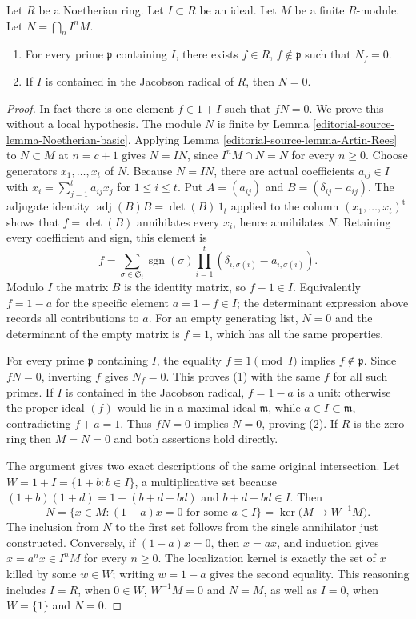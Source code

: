 \begin{lemma}
\label{editorial-source-lemma-intersection-powers-ideal-module}
Let $R$ be a Noetherian ring. Let $I \subset R$ be an ideal.
Let $M$ be a finite $R$-module. Let $N = \bigcap_n I^n M$.
\begin{enumerate}
\item For every prime $\mathfrak p$ containing $I$, there
exists $f \in R$, $f \not \in \mathfrak p$ such that $N_f = 0$.
\item If $I$ is contained in the Jacobson radical
of $R$, then $N = 0$.
\end{enumerate}
\end{lemma}

\begin{proof}
In fact there is one element $f\in1+I$ such that $fN=0$.
We prove this without a local hypothesis. The module $N$ is finite
by Lemma \ref{editorial-source-lemma-Noetherian-basic}. Applying
Lemma \ref{editorial-source-lemma-Artin-Rees} to $N\subset M$ at $n=c+1$
gives $N=IN$, since $I^nM\cap N=N$ for every $n\geq0$.
Choose generators $x_1,\ldots,x_t$ of $N$. Because $N=IN$,
there are actual coefficients $a_{ij}\in I$ with
$x_i=\sum_{j=1}^t a_{ij}x_j$ for $1\leq i\leq t$.
Put $A=(a_{ij})$ and $B=(\delta_{ij}-a_{ij})$.
The adjugate identity $\operatorname{adj}(B)B=\det(B)\,1_t$
applied to the column $(x_1,\ldots,x_t)^{\mathrm t}$ shows
that $f=\det(B)$ annihilates every $x_i$, hence annihilates $N$.
Retaining every coefficient and sign, this element is
$$
f=\sum_{\sigma\in\mathfrak S_t}\operatorname{sgn}(\sigma)
       \prod_{i=1}^t(\delta_{i,\sigma(i)}-a_{i,\sigma(i)}).
$$
Modulo $I$ the matrix $B$ is the identity matrix, so $f-1\in I$.
Equivalently $f=1-a$ for the specific element $a=1-f\in I$;
the determinant expression above records all contributions to $a$.
For an empty generating list, $N=0$ and the determinant of the
empty matrix is $f=1$, which has all the same properties.

For every prime $\mathfrak p$ containing $I$, the equality
$f\equiv1\pmod I$ implies $f\notin\mathfrak p$.
Since $fN=0$, inverting $f$ gives $N_f=0$. This proves (1)
with the same $f$ for all such primes. If $I$ is contained in the
Jacobson radical, $f=1-a$ is a unit: otherwise the proper ideal
$(f)$ would lie in a maximal ideal $\mathfrak m$, while
$a\in I\subset\mathfrak m$, contradicting $f+a=1$.
Thus $fN=0$ implies $N=0$, proving (2). If $R$ is the zero
ring then $M=N=0$ and both assertions hold directly.

The argument gives two exact descriptions of the same original
intersection. Let $W=1+I=\{1+b:b\in I\}$, a multiplicative
set because $(1+b)(1+d)=1+(b+d+bd)$ and $b+d+bd\in I$.
Then
$$
N=\{x\in M:(1-a)x=0\text{ for some }a\in I\}
=\ker\bigl(M\longrightarrow W^{-1}M\bigr).
$$
The inclusion from $N$ to the first set follows from the single
annihilator just constructed. Conversely, if $(1-a)x=0$,
then $x=ax$, and induction gives $x=a^nx\in I^nM$ for
every $n\geq0$. The localization kernel is exactly the set of
$x$ killed by some $w\in W$; writing $w=1-a$ gives the
second equality. This reasoning includes $I=R$, when $0\in W$,
$W^{-1}M=0$ and $N=M$, as well as $I=0$, when $W=\{1\}$
and $N=0$.


\end{proof}

